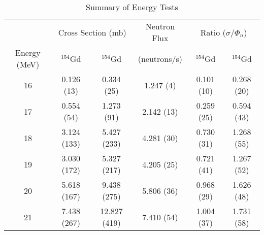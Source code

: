 \begin{table}[]
    \centering
    \begin{tabular}{c|c|c|c|c|c}
        \toprule
        & \multicolumn{2}{c|}{Cross Section (mb)} & Neutron Flux & \multicolumn{2}{c}{Ratio ($\sigma/\Phi_n$)} \\
        Energy (MeV) & $^{154}$Gd & $^{154}$Gd & (neutrons/s) & $^{154}$Gd & $^{154}$Gd \\
        \hline
        16 & 0.126 (13) & 0.334 (25) & 1.247 (4) & 0.101 (10) & 0.268 (20)\\
        17 & 0.554 (54) & 1.273 (91) & 2.142 (13) & 0.259 (25) & 0.594 (43)\\
        18 & 3.124 (133) & 5.427 (233) & 4.281 (30) & 0.730 (31) & 1.268 (55)\\
        19 & 3.030 (172) & 5.327 (217) & 4.205 (25) & 0.721 (41) & 1.267 (52)\\
        20 & 5.618 (167) & 9.438 (275) & 5.806 (36) & 0.968 (29) & 1.626 (48)\\
        21 & 7.438 (267) & 12.827 (419) & 7.410 (54) & 1.004 (37) & 1.731 (58)\\ 
        \bottomrule
    \end{tabular}
    \caption{Summary of Energy Tests}
    \label{tab:neutrons}
\end{table}